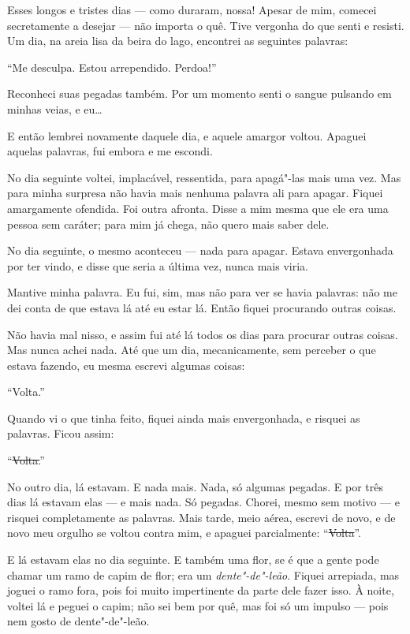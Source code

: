Esses longos e tristes dias --- como duraram, nossa! Apesar de mim, comecei
secretamente a desejar --- não importa o quê. Tive vergonha do que
senti e resisti. Um dia, na areia lisa da beira do lago, encontrei as seguintes
palavras:

“Me desculpa. Estou arrependido. Perdoa!”

Reconheci suas pegadas também. Por um momento senti o sangue pulsando em minhas
veias, e eu\ldots{}

E então lembrei novamente daquele dia, e aquele amargor voltou. Apaguei aquelas
palavras, fui embora e me escondi.

No dia seguinte voltei, implacável, ressentida, para apagá"-las mais uma vez. Mas
para minha surpresa não havia mais nenhuma palavra ali para apagar. Fiquei amargamente ofendida.
Foi outra afronta. Disse a mim mesma que ele era uma pessoa sem caráter; para mim já chega, não
quero mais saber dele.

No dia seguinte, o mesmo aconteceu --- nada para apagar. Estava envergonhada
por ter vindo, e disse que seria a última vez, nunca mais viria.

Mantive minha palavra. Eu fui, sim, mas não para ver se havia palavras: não me
dei conta de que estava lá até eu estar lá. Então fiquei procurando outras coisas.

Não havia mal nisso, e assim fui até lá todos os dias para procurar outras coisas.
Mas nunca achei nada. Até que um dia, mecanicamente, sem perceber
o que estava fazendo, eu mesma escrevi algumas coisas:

“Volta.”

Quando vi o que tinha feito, fiquei ainda mais envergonhada, e risquei as
palavras. Ficou assim:

“\st{Volta.}”

No outro dia, lá estavam. E nada mais. Nada, só algumas pegadas. E por três
dias lá estavam elas --- e mais nada. Só pegadas. Chorei, mesmo sem motivo --- 
e risquei completamente as palavras. Mais tarde, meio
aérea, escrevi de novo, e de novo meu orgulho se voltou contra mim, e
apaguei parcialmente: “\st{Volta}”.

E lá estavam elas no dia seguinte. E também uma flor, se é que a gente pode chamar
um ramo de capim de flor; era um \textit{dente"-de"-leão}. Fiquei arrepiada, mas
joguei o ramo fora, pois foi muito impertinente da parte dele fazer isso. À noite,
voltei lá e peguei o capim; não sei bem por quê, mas foi só um impulso --- pois nem
gosto de dente"-de"-leão.


